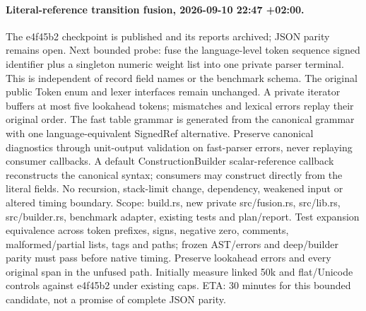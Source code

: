 \documentclass[11pt,a4paper]{article}
\begin{document}
\paragraph{Literal-reference transition fusion, 2026-09-10 22:47 +02:00.}
The e4f45b2 checkpoint is published and its reports archived; JSON parity remains
open. Next bounded probe: fuse the language-level token sequence signed identifier
plus a singleton numeric weight list into one private parser terminal. This is
independent of record field names or the benchmark schema. The original public
Token enum and lexer interfaces remain unchanged. A private iterator buffers at
most five lookahead tokens; mismatches and lexical errors replay their original
order. The fast table grammar is generated from the canonical grammar with one
language-equivalent SignedRef alternative. Preserve canonical diagnostics through
unit-output validation on fast-parser errors, never replaying consumer callbacks.
A default ConstructionBuilder scalar-reference callback reconstructs the canonical
syntax; consumers may construct directly from the literal fields. No recursion,
stack-limit change, dependency, weakened input or altered timing boundary.
Scope: build.rs, new private src/fusion.rs, src/lib.rs, src/builder.rs, benchmark
adapter, existing tests and plan/report. Test expansion equivalence across token
prefixes, signs, negative zero, comments, malformed/partial lists, tags and paths;
frozen AST/errors and deep/builder parity must pass before native timing. Preserve
lookahead errors and every original span in the unfused path. Initially measure
linked 50k and flat/Unicode controls against e4f45b2 under existing caps. ETA: 30
minutes for this bounded candidate, not a promise of complete JSON parity.
\end{document}
